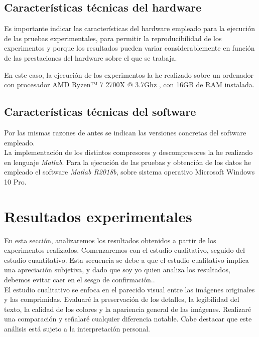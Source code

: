 \documentclass[12pt,a4paper]{article}
\begin{document}
\subsection{Características técnicas del hardware}
Es importante indicar las características del hardware empleado para la ejecución de las pruebas experimentales, para permitir la reproducibilidad de los experimentos y porque los resultados pueden variar considerablemente en función de las prestaciones del hardware sobre el que se trabaja.\\


En este caso, la ejecución de los experimentos la he realizado sobre un ordenador con procesador AMD Ryzen™ 7 2700X @ 3.7Ghz , con 16GB de RAM instalada.


\subsection{Características técnicas del software}
Por las mismas razones de antes se indican las versiones concretas del software empleado.\\

La implementación de los distintos compresores y descompresores la he realizado en lenguaje \textit{Matlab}. Para la ejecución de las pruebas y obtención de los datos he empleado el software \textit{Matlab R2018b}, sobre sistema operativo Microsoft Windows 10 Pro.  

\newpage
\section{Resultados experimentales}
En esta sección, analizaremos los resultados obtenidos a partir de los experimentos realizados. Comenzaremos con el estudio cualitativo, seguido del estudio cuantitativo. Esta secuencia se debe a que el estudio cualitativo implica una apreciación subjetiva, y dado que soy yo quien analiza los resultados, debemos evitar caer en el sesgo de confirmación..\\  

El estudio cualitativo se enfoca en el parecido visual entre las imágenes originales y las comprimidas. Evaluaré la preservación de los detalles, la legibilidad del texto, la calidad de los colores y la apariencia general de las imágenes. Realizaré una comparación y señalaré cualquier diferencia notable. Cabe destacar que este análisis está sujeto a la interpretación personal.\\
\end{document}
